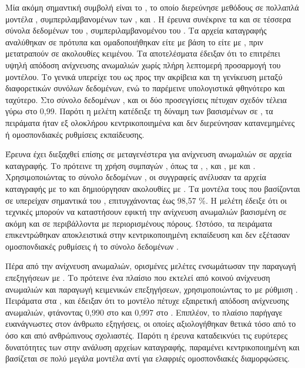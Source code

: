 Μία ακόμη σημαντική συμβολή είναι το  \cite{lim2025adapting}, το οποίο διερεύνησε μεθόδους  σε πολλαπλά μοντέλα , συμπεριλαμβανομένων των ,  και . Η έρευνα συνέκρινε τα  και  σε τέσσερα σύνολα δεδομένων του , συμπεριλαμβανομένου του . Τα αρχεία καταγραφής αναλύθηκαν σε πρότυπα και ομαδοποιήθηκαν είτε με βάση το  είτε με , πριν μετατραπούν σε ακολουθίες κειμένου. Τα αποτελέσματα έδειξαν ότι το  επιτρέπει υψηλή απόδοση ανίχνευσης ανωμαλιών χωρίς πλήρη λεπτομερή προσαρμογή του μοντέλου. Το  γενικά υπερείχε του  ως προς την ακρίβεια και τη γενίκευση μεταξύ διαφορετικών συνόλων δεδομένων, ενώ το  παρέμεινε υπολογιστικά φθηνότερο και ταχύτερο. Στο σύνολο δεδομένων , και οι δύο προσεγγίσεις πέτυχαν σχεδόν τέλεια  γύρω στο 0,99. Παρότι η μελέτη κατέδειξε τη δύναμη των  βασισμένων σε , τα πειράματα ήταν εξ ολοκλήρου κεντρικοποιημένα και δεν διερεύνησαν κατανεμημένες ή ομοσπονδιακές ρυθμίσεις εκπαίδευσης.

Έρευνα έχει διεξαχθεί επίσης σε μεταγενέστερα   για ανίχνευση ανωμαλιών σε αρχεία καταγραφής. Το  \cite{ocansey2025logtinyllm} πρότεινε τη χρήση συμπαγών , όπως τα , ,  και , με  και . Χρησιμοποιώντας το σύνολο δεδομένων , οι συγγραφείς ανέλυσαν τα αρχεία καταγραφής με το  και δημιούργησαν ακολουθίες με . Τα μοντέλα τους που βασίζονται σε  υπερείχαν σημαντικά του , επιτυγχάνοντας  έως 98,57 \%. Η μελέτη έδειξε ότι οι τεχνικές  μπορούν να καταστήσουν εφικτή την ανίχνευση ανωμαλιών βασισμένη σε  ακόμη και σε περιβάλλοντα με περιορισμένους πόρους. Ωστόσο, τα πειράματα επικεντρώθηκαν αποκλειστικά στην κεντρικοποιημένη εκπαίδευση και δεν εξέτασαν ομοσπονδιακές ρυθμίσεις ή το σύνολο δεδομένων .

Πέρα από την ανίχνευση ανωμαλιών, ορισμένες μελέτες ενσωμάτωσαν την παραγωγή επεξηγήσεων με . Το  \cite{ZHANG2025114064} πρότεινε ένα πλαίσιο που εκτελεί από κοινού ανίχνευση ανωμαλιών και παραγωγή κειμενικών επεξηγήσεων, χρησιμοποιώντας το  με ρύθμιση . Πειράματα στα ,  και  έδειξαν ότι το μοντέλο πέτυχε εξαιρετική απόδοση ανίχνευσης ανωμαλιών, φτάνοντας  0,990 στο  και 0,997 στο . Επιπλέον, το πλαίσιο παρήγαγε ευανάγνωστες στον άνθρωπο εξηγήσεις, οι οποίες αξιολογήθηκαν θετικά τόσο από το  όσο και από ανθρώπινους σχολιαστές. Παρότι η έρευνα καταδεικνύει τις ευρύτερες δυνατότητες των  στην ανάλυση αρχείων καταγραφής, παραμένει κεντρικοποιημένη και βασίζεται σε πολύ μεγάλα μοντέλα αντί για ελαφριές ομοσπονδιακές διαμορφώσεις.

